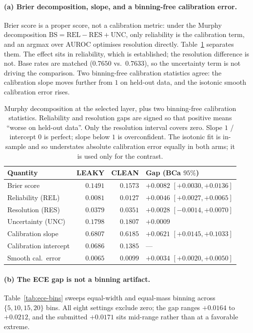 \documentclass{article}
\begin{document}
\paragraph{(a) Brier decomposition, slope, and a binning-free calibration
error.} Brier score is a proper score, not a calibration metric: under the
Murphy decomposition $\mathrm{BS}=\mathrm{REL}-\mathrm{RES}+\mathrm{UNC}$, only
reliability is the calibration term, and an argmax over AUROC optimises
resolution directly. Table~\ref{tab:murphy} separates them. The effect sits in
reliability, which is established; the resolution difference is not. Base rates
are matched ($0.7650$ vs.\ $0.7633$), so the uncertainty term is not driving
the comparison. Two binning-free calibration statistics agree: the calibration
slope moves further from $1$ on held-out data, and the isotonic smooth
calibration error rises.

\begin{table}[h]
\centering
\small
\begin{tabular}{@{}lrrl@{}}
\toprule
Quantity & LEAKY & CLEAN & Gap (BCa $95\%$) \\
\midrule
Brier score            & $0.1491$ & $0.1573$ & $+0.0082$ $[+0.0030,+0.0136]$ \\
\;\;Reliability (REL)  & $0.0081$ & $0.0127$ & $+0.0046$ $[+0.0027,+0.0065]$ \\
\;\;Resolution (RES)   & $0.0379$ & $0.0351$ & $+0.0028$ $[-0.0014,+0.0070]$ \\
\;\;Uncertainty (UNC)  & $0.1798$ & $0.1807$ & $+0.0009$ \\
\midrule
Calibration slope      & $0.6807$ & $0.6185$ & $+0.0621$ $[+0.0145,+0.1033]$ \\
Calibration intercept  & $0.0686$ & $0.1385$ & --- \\
Smooth cal.\ error     & $0.0065$ & $0.0099$ & $+0.0034$ $[+0.0020,+0.0050]$ \\
\bottomrule
\end{tabular}
\caption{Murphy decomposition at the selected layer, plus two binning-free
calibration statistics. Reliability and resolution gaps are signed so that
positive means ``worse on held-out data''. Only the resolution interval covers
zero. Slope $1$ / intercept $0$ is perfect; slope below $1$ is overconfident.
The isotonic fit is in-sample and so understates absolute calibration error
equally in both arms; it is used only for the contrast.}
\label{tab:murphy}
\end{table}

\paragraph{(b) The ECE gap is not a binning artifact.} Table~\ref{tab:ece-bins}
sweeps equal-width and equal-mass binning across $\{5,10,15,20\}$ bins. All
eight settings exclude zero; the gap ranges $+0.0164$ to $+0.0212$, and the
submitted $+0.0171$ sits mid-range rather than at a favorable extreme.
\end{document}
